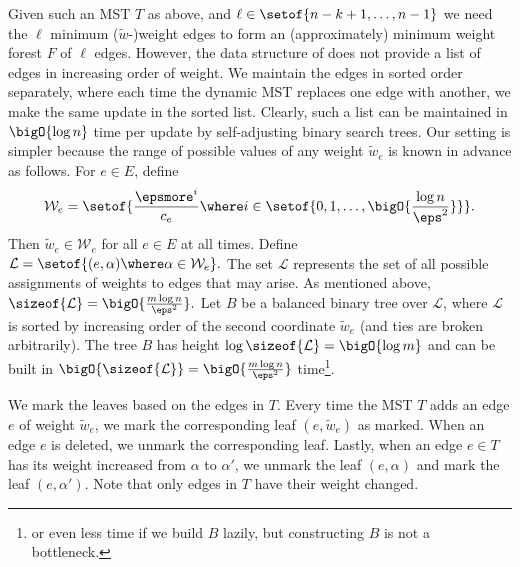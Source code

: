 \documentclass{toc}
\newcommand{\costof}[1]{c_{#1}}
\newcommand{\weights}[1]{\mathcal{W}_{#1}} %
\newcommand{\leaves}{\mathcal{L}} %
\newcommand{\apxweight}{\tilde{w}}%
\newcommand{\apxweightof}[1]{\apxweight_{#1}}%
\begin{document}
Given such an MST $T$ as above, and
\begin{math}
  \ell \in \setof{n - k+1,\dots,n-1}
\end{math}
we need the $\ell$ minimum ($\apxweight$-)weight edges to form an
(approximately) minimum weight forest $F$ of $\ell$ edges. However,
the data structure of  does not provide a list
of edges in increasing order of weight. We maintain the edges in
sorted order separately, where each time the dynamic MST replaces one
edge with another, we make the same update in the sorted
list. Clearly, such a list can be maintained in $\bigO{\log n}$ time
per update by self-adjusting binary search trees. Our setting is
simpler because the range of possible values of any weight
$\apxweightof{e}$ is known in advance as follows.  For $e \in E$, define
\begin{align*}
  \weights{e} =                 %
  \setof{                       %
  \frac{\epsmore^i}{\costof{e}}   %
  \where                        %
  i \in
  \setof{0,1,\dots,\bigO{\frac{\log n}{\eps^2}}} %
  }.
\end{align*}
Then $\apxweightof{e} \in \weights{e}$ for all $e \in E$ at all
times. Define
\begin{math}
  \leaves = \setof{ (e,\alpha) \where \alpha \in \weights{e}}.
\end{math}
The set $\leaves$ represents the set of all possible assignments of
weights to edges that may arise. As mentioned above,
\begin{math}
  \sizeof{\leaves} = \bigO{\frac{m \log n}{\eps^2}}.
\end{math}
Let $B$ be a balanced binary tree over $\leaves$, where $\leaves$ is
sorted by increasing order of the second coordinate $\apxweightof{e}$
(and ties are broken arbitrarily). The tree $B$ has height
$\log \sizeof{\leaves} = \bigO{\log m}$ and can be built in
$\bigO{\sizeof{\leaves}} = \bigO{\frac{m \log n}{\eps^2}}$
time\footnote{or even less time if we build $B$ lazily, but
  constructing $B$ is not a bottleneck.}.

We mark the leaves based on the edges in $T$.  Every time the MST $T$
adds an edge $e$ of weight $\apxweightof{e}$, we mark the corresponding
leaf $(e,\apxweightof{e})$ as marked. When an edge $e$ is deleted, we
unmark the corresponding leaf. Lastly, when an edge $e \in T$ has its
weight increased from $\alpha$ to $\alpha'$, we unmark the leaf
$(e,\alpha)$ and mark the leaf $(e,\alpha')$. Note that only edges in
$T$ have their weight changed.
\end{document}
